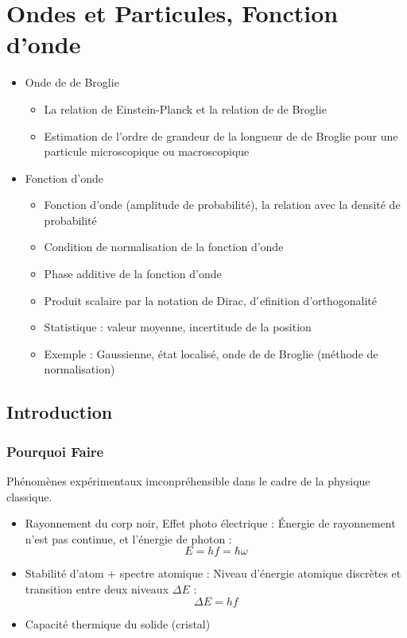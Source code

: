 \chapter{Ondes et Particules, Fonction d'onde}

\begin{tcolorbox}
  \begin{itemize}

      \item Onde de de Broglie
        \begin{itemize}

            \item La relation de Einstein-Planck et la relation de de Broglie 
            \item Estimation de l’ordre de grandeur de la longueur de de Broglie pour une particule microscopique ou macroscopique
        \end{itemize}

      \item Fonction d’onde
  \begin{itemize}

        \item Fonction d’onde (amplitude de probabilité), la relation avec la densité de probabilité
        \item Condition de normalisation de la fonction d’onde
        \item Phase additive de la fonction d’onde
        \item Produit scalaire par la notation de Dirac, d ́efinition d’orthogonalité
        \item Statistique : valeur moyenne, incertitude de la position
        \item Exemple : Gaussienne, état localisé, onde de de Broglie (méthode de normalisation)

    \end{itemize}      


  \end{itemize}
\end{tcolorbox}

\section{Introduction}

\subsection{Pourquoi Faire}
Phénomènes expérimentaux imconpréhensible dans le cadre de la physique classique.
        \begin{itemize}
            \item Rayonnement du corp noir, Effet photo électrique : Énergie de rayonnement n'est pas continue, et l'énergie de photon :
                \[
                E = hf = \hbar \omega
                \]
            \item Stabilité d'atom + spectre atomique : Niveau d'énergie atomique discrètes et transition entre deux niveaux $\Delta E$ :
                \[
                \Delta E = hf
                \]
            \item Capacité thermique du solide (cristal) 
        \end{itemize}
